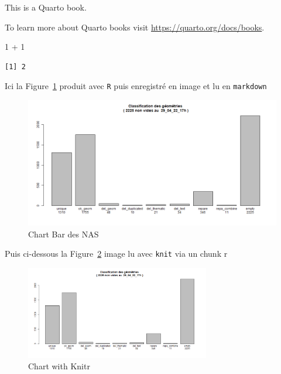 \documentclass[
  12pt,
  a4paperpaper,
]{book}
\newenvironment{Shaded}{\begin{snugshade}}{\end{snugshade}}
\newcommand{\DecValTok}[1]{\textcolor[rgb]{0.16,0.63,0.60}{#1}}
\newcommand{\SpecialCharTok}[1]{\textcolor[rgb]{0.86,0.20,0.18}{#1}}
\begin{document}
This is a Quarto book.

To learn more about Quarto books visit
\url{https://quarto.org/docs/books}.

\begin{Shaded}
\begin{Highlighting}[numbers=left,,]
\DecValTok{1} \SpecialCharTok{+} \DecValTok{1}
\end{Highlighting}
\end{Shaded}

\begin{verbatim}
[1] 2
\end{verbatim}

Ici la Figure~\ref{fig-chart1} produit avec \texttt{R} puis enregistré
en image et lu en \texttt{markdown}

\begin{figure}

{\centering \includegraphics{./figures/bar_classify_Del_29_04_22_17h.png}

}

\caption{\label{fig-chart1}Chart Bar des NAS}

\end{figure}

Puis ci-dessous la Figure~\ref{fig-chart2} image lu avec \texttt{knit}
via un chunk r

\begin{figure}

{\centering \includegraphics[width=3.17in,height=\textheight]{./figures/bar_classify_Del_29_04_22_17h.png}

}

\caption{\label{fig-chart2}Chart with Knitr}

\end{figure}
\end{document}

